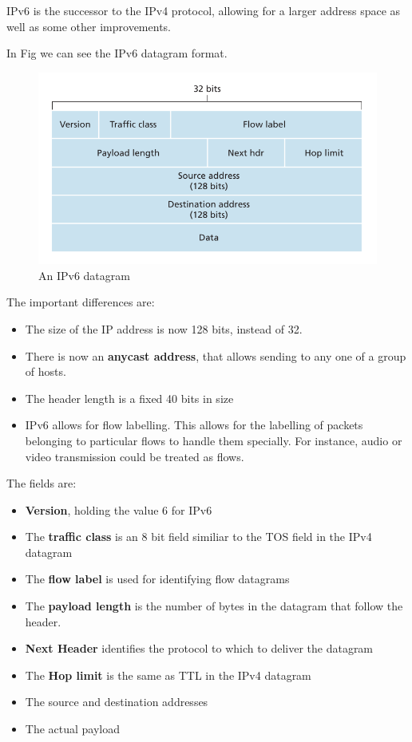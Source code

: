\documentclass[12pt,letterpaper]{book}
\theoremstyle{definition}
\begin{document}
IPv6 is the successor to the IPv4 protocol, allowing for a larger address space as well as some other improvements.

In Fig we can see the IPv6 datagram format.

\begin{figure}[htpb]
  \centering
  \includegraphics[width=0.8\linewidth]{./assets/ipv6_datagram.png}
  \caption{An IPv6 datagram}%
  \label{fig:}
\end{figure}

The important differences are:

\begin{itemize}
  \item The size of the IP address is now 128 bits, instead of 32.
  \item There is now an \textbf{anycast address}, that allows sending to any one of a group of hosts.
  \item The header length is a fixed 40 bits in size
  \item IPv6 allows for flow labelling. This allows for the labelling of packets belonging to particular flows to handle them specially. For instance, audio or video transmission could be treated as flows.
\end{itemize}

The fields are:
\begin{itemize}
  \item \textbf{Version}, holding the value 6 for IPv6
  \item The \textbf{traffic class} is an 8 bit field similiar to the TOS field in the IPv4 datagram
  \item The \textbf{flow label} is used for identifying flow datagrams
  \item The \textbf{payload length}  is the number of bytes in the datagram that follow the header.
  \item \textbf{Next Header}  identifies the protocol to which to deliver the datagram
  \item The \textbf{Hop limit}  is the same as TTL in the IPv4 datagram
  \item The source and destination addresses
  \item The actual payload
\end{itemize}
\end{document}

